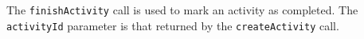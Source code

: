 The \verb+finishActivity+ call is used to mark an activity as completed. The \verb+activityId+ parameter
is that returned by the \verb+createActivity+ call.
